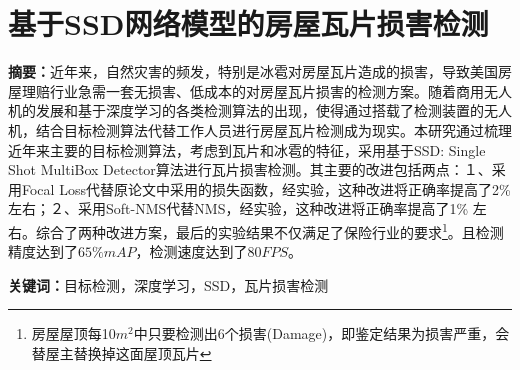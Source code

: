 \section*{基于SSD网络模型的房屋瓦片损害检测}
\par \noindent
\textbf{\songti {}摘要：}近年来，自然灾害的频发，特别是冰雹对房屋瓦片造成的损害，导致美国房屋理赔行业急需一套无损害、低成本的对房屋瓦片损害的检测方案。随着商用无人机的发展和基于深度学习的各类检测算法的出现，使得通过搭载了检测装置的无人机，结合目标检测算法代替工作人员进行房屋瓦片检测成为现实。本研究通过梳理近年来主要的目标检测算法，考虑到瓦片和冰雹的特征，采用基于SSD: Single Shot MultiBox Detector\cite{ssd}算法进行瓦片损害检测。其主要的改进包括两点：１、采用Focal Loss\cite{focal-loss}代替原论文中采用的损失函数，经实验，这种改进将正确率提高了2\% 左右；２、采用Soft-NMS\cite{soft-nms}代替NMS，经实验，这种改进将正确率提高了1\% 左右。综合了两种改进方案，最后的实验结果不仅满足了保险行业的要求\footnote{房屋屋顶每10$m^2$中只要检测出6个损害(Damage)，即鉴定结果为损害严重，会替屋主替换掉这面屋顶瓦片}。且检测精度达到了$65\%mAP$，检测速度达到了$80FPS$。

\par \noindent
\textbf{\songti {}关键词：}{\kaishu {}目标检测，深度学习，SSD，瓦片损害检测}

